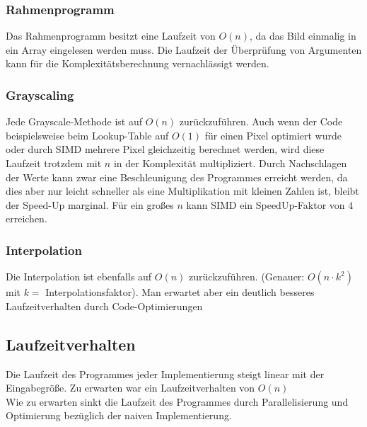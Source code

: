 \documentclass[course=erap]{aspdoc}
\begin{document}
\subsubsection{Rahmenprogramm}
Das Rahmenprogramm besitzt eine Laufzeit von $O(n)$, da das Bild einmalig in ein Array eingelesen werden muss. Die Laufzeit der Überprüfung von Argumenten kann für die Komplexitätsberechnung vernachlässigt werden.

\subsubsection{Grayscaling}
Jede Grayscale-Methode ist auf $O(n)$ zurückzuführen. Auch wenn der Code beispielsweise beim Lookup-Table auf $O(1)$ für einen Pixel optimiert wurde oder durch SIMD mehrere Pixel gleichzeitig berechnet werden, wird diese Laufzeit trotzdem mit $n$ in der Komplexität multipliziert. Durch Nachschlagen der Werte kann zwar eine Beschleunigung des Programmes erreicht werden, da dies aber nur leicht schneller als eine Multiplikation mit kleinen Zahlen ist, bleibt der Speed-Up marginal. Für ein großes $n$ kann SIMD ein SpeedUp-Faktor von $4$ erreichen.

\subsubsection{Interpolation}
Die Interpolation ist ebenfalls auf $O(n)$ zurückzuführen. (Genauer: $O(n \cdot k^{2})$ mit $k =$ Interpolationsfaktor). Man erwartet aber ein deutlich besseres Laufzeitverhalten durch Code-Optimierungen

\subsection{Laufzeitverhalten}
Die Laufzeit des Programmes jeder Implementierung steigt linear mit der Eingabegröße. Zu erwarten war ein Laufzeitverhalten von $O(n)$\\
Wie zu erwarten sinkt die Laufzeit des Programmes durch Parallelisierung und Optimierung bezüglich der naiven Implementierung.
\end{document}
